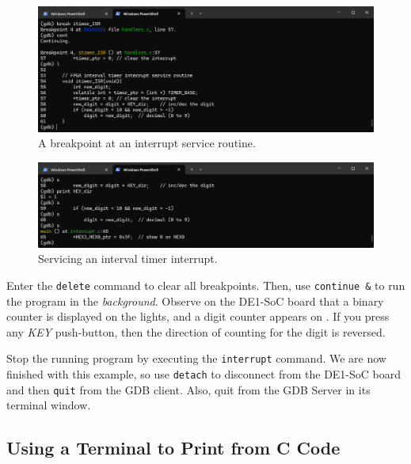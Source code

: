 \documentclass[11pt, twoside, pdftex]{article}
\newcommand{\red}[1]{{\color{red}\sf{#1}}}
\begin{document}
\begin{figure}[h]
    \begin{center}
        \includegraphics[scale=.6]{figures/interrupt_C6.png}
        \caption{A breakpoint at an interrupt service routine.}
        \label{fig:interrupt_C6}
    \end{center}
\end{figure}

\begin{figure}[h]
    \begin{center}
        \includegraphics[scale=.6]{figures/interrupt_C7.png}
        \caption{Servicing an interval timer interrupt.}
        \label{fig:interrupt_C7}
    \end{center}
\end{figure}

Enter the \texttt{delete} command to clear all breakpoints. Then, use \texttt{continue \&}
to run the program in the {\it background}. Observe on the DE1-SoC board that a binary
counter is displayed on the \red{\it LEDR} lights, and a digit counter appears on 
\red{\it HEX0}. If you press any {\it KEY} push-button, then the direction of counting
for the digit is reversed.

Stop the running program by executing the \texttt{interrupt} command. 
We are now finished with this example, so use \texttt{detach} to disconnect from the DE1-SoC 
board and then \texttt{quit} from the GDB client. Also, quit from the GDB Server in its 
terminal window. 

\subsection{Using a Terminal to Print from C Code}
\end{document}

